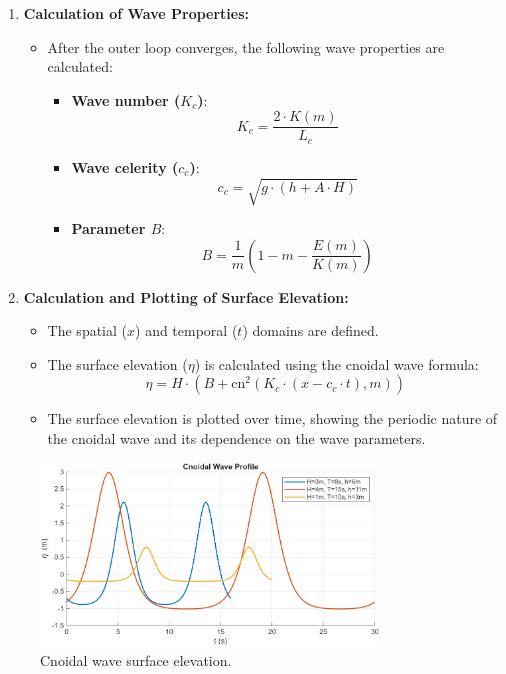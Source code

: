 \documentclass[a4paper]{article}
\begin{document}
\begin{enumerate}
    \item \textbf{Calculation of Wave Properties:}
    \begin{itemize}
        \item After the outer loop converges, the following wave properties are calculated:
        \begin{itemize}
            \item \textbf{Wave number (\(K_c\))}:
            \[
            K_c = \frac{2 \cdot K(m)}{L_c}
            \]
            \item \textbf{Wave celerity (\(c_c\))}:
            \[
            c_c = \sqrt{g \cdot (h + A \cdot H)}
            \]
            \item \textbf{Parameter \(B\)}:
            \[
            B = \frac{1}{m} \left(1 - m - \frac{E(m)}{K(m)}\right)
            \]
        \end{itemize}
    \end{itemize}

    \item \textbf{Calculation and Plotting of Surface Elevation:}
    \begin{itemize}
        \item The spatial (\(x\)) and temporal (\(t\)) domains are defined.
        \item The surface elevation (\(\eta\)) is calculated using the cnoidal wave formula:
        \[
        \eta = H \cdot \left(B + \text{cn}^2\left(K_c \cdot (x - c_c \cdot t), m\right)\right)
        \]
        \item The surface elevation is plotted over time, showing the periodic nature of the cnoidal wave and its dependence on the wave parameters.
    \end{itemize}
\end{enumerate}

\begin{figure}[H]
    \centering
    \includegraphics[width=0.8\textwidth]{CE591HW1-Q4.png}
    \caption{\small Cnoidal wave surface elevation.}
    \label{fig:plot4}
\end{figure} 
\end{document}
